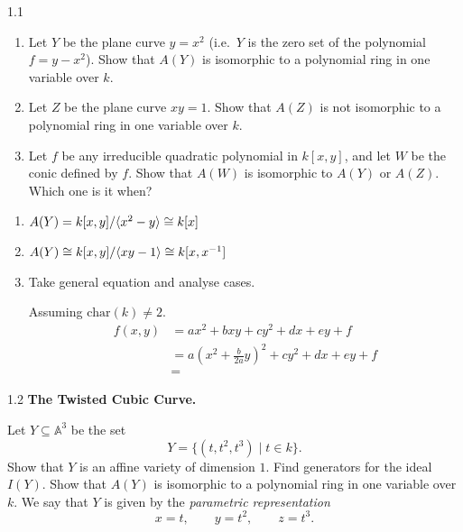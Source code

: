 \documentclass[12pt]{article}
\begin{document}


\begin{problem}{1.1}
\begin{enumerate}
    \item[(a)] Let $Y$ be the plane curve $y=x^2$ (i.e.\ $Y$ is the zero set of the polynomial $f=y-x^2$). Show that $A(Y)$ is isomorphic to a polynomial ring in one variable over $k$.

    \item[(b)] Let $Z$ be the plane curve $xy=1$. Show that $A(Z)$ is not isomorphic to a polynomial ring in one variable over $k$.

    \item[(c)] Let $f$ be any irreducible quadratic polynomial in $k[x,y]$, and let $W$ be the conic defined by $f$. Show that $A(W)$ is isomorphic to $A(Y)$ or $A(Z)$. Which one is it when?
\end{enumerate}
\end{problem}

\begin{solution}
    \bbni
    \begin{enumerate}
        \item[(a)] $A(Y) = k[x,y]/\langle x^2 - y \rangle \cong k[x]$

        \item[(b)] $A(Y) \cong k[x,y]/\langle xy -1 \rangle \cong k[x, x^{-1}]$

        \item[(c)] Take general equation and analyse cases. 
        
        Assuming $\text{char}(k) \neq 2$. 
        \begin{align*}
            f(x,y) &= ax^2 + bxy + cy^2 + dx + ey +f \\ 
            &= a (x^2 + \frac{b}{2a}y)^2 + cy^2 + dx + ey + f \\ 
            &= 
        \end{align*}
    \end{enumerate}
\end{solution}

\begin{problem}{1.2} \textbf{The Twisted Cubic Curve.}

    Let $Y \subseteq \mathbb A^3$ be the set
    \[
    Y=\{(t,t^2,t^3)\mid t\in k\}.
    \]
    Show that $Y$ is an affine variety of dimension $1$. Find generators for the ideal $I(Y)$. Show that $A(Y)$ is isomorphic to a polynomial ring in one variable over $k$. We say that $Y$ is given by the \emph{parametric representation}
    \[
    x=t,\qquad y=t^2,\qquad z=t^3.
    \]
\end{problem}
\end{document}
